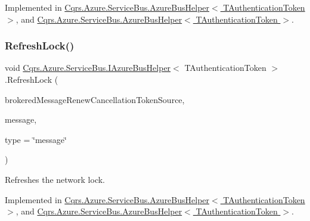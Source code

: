 Implemented in \hyperlink{classCqrs_1_1Azure_1_1ServiceBus_1_1AzureBusHelper_ae25e1c5b54e32e79d37bbcd2fd73c70d_ae25e1c5b54e32e79d37bbcd2fd73c70d}{Cqrs.\+Azure.\+Service\+Bus.\+Azure\+Bus\+Helper$<$ T\+Authentication\+Token $>$}, and \hyperlink{classCqrs_1_1Azure_1_1ServiceBus_1_1AzureBusHelper_ae25e1c5b54e32e79d37bbcd2fd73c70d_ae25e1c5b54e32e79d37bbcd2fd73c70d}{Cqrs.\+Azure.\+Service\+Bus.\+Azure\+Bus\+Helper$<$ T\+Authentication\+Token $>$}.

\mbox{\label{interfaceCqrs_1_1Azure_1_1ServiceBus_1_1IAzureBusHelper_a51988703dad9dc41c834e620e4e6e31a_a51988703dad9dc41c834e620e4e6e31a}} 
\subsubsection{\texorpdfstring{Refresh\+Lock()}{RefreshLock()}}
{\footnotesize\ttfamily void \hyperlink{interfaceCqrs_1_1Azure_1_1ServiceBus_1_1IAzureBusHelper}{Cqrs.\+Azure.\+Service\+Bus.\+I\+Azure\+Bus\+Helper}$<$ T\+Authentication\+Token $>$.Refresh\+Lock (\begin{DoxyParamCaption}\item[{Cancellation\+Token\+Source}]{brokered\+Message\+Renew\+Cancellation\+Token\+Source,  }\item[{Brokered\+Message}]{message,  }\item[{string}]{type = {\ttfamily \char`\"{}message\char`\"{}} }\end{DoxyParamCaption})}



Refreshes the network lock. 



Implemented in \hyperlink{classCqrs_1_1Azure_1_1ServiceBus_1_1AzureBusHelper_aa4ef095148aae1af508fcd7b51f538d3_aa4ef095148aae1af508fcd7b51f538d3}{Cqrs.\+Azure.\+Service\+Bus.\+Azure\+Bus\+Helper$<$ T\+Authentication\+Token $>$}, and \hyperlink{classCqrs_1_1Azure_1_1ServiceBus_1_1AzureBusHelper_aa4ef095148aae1af508fcd7b51f538d3_aa4ef095148aae1af508fcd7b51f538d3}{Cqrs.\+Azure.\+Service\+Bus.\+Azure\+Bus\+Helper$<$ T\+Authentication\+Token $>$}.

